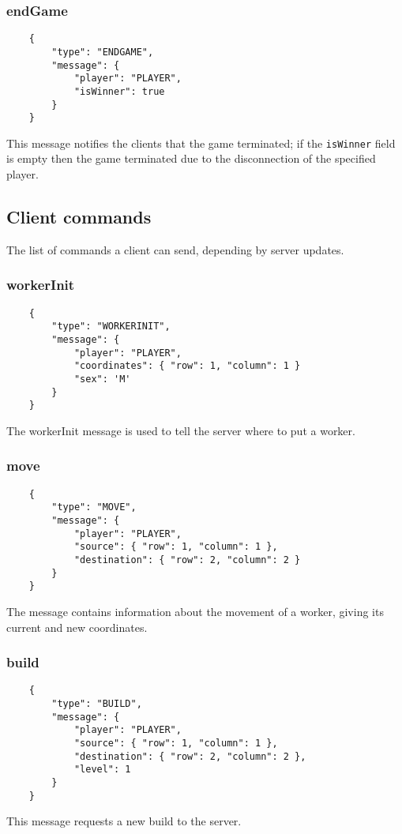 \documentclass[a4paper,12pt,english]{article}
\begin{document}
	\subsubsection{endGame}
	\begin{verbatim}
	{
	    "type": "ENDGAME",
	    "message": {
	        "player": "PLAYER", 
	        "isWinner": true
	    }
	}
	\end{verbatim}
	This message notifies the clients that the game terminated; if the \texttt{isWinner} field is empty then the game terminated due to the disconnection of the specified player.
	
	\subsection{Client commands}
	The list of commands a client can send, depending by server updates.
	
	\subsubsection{workerInit}
	\begin{verbatim}
	{
	    "type": "WORKERINIT",
	    "message": {
	        "player": "PLAYER",
	        "coordinates": { "row": 1, "column": 1 }
	        "sex": 'M'
	    }
	}
	\end{verbatim}
	The workerInit message is used to tell the server where to put a worker.
	
	\subsubsection{move}
	\begin{verbatim}
	{
	    "type": "MOVE",
	    "message": {
	        "player": "PLAYER",
	        "source": { "row": 1, "column": 1 },
	        "destination": { "row": 2, "column": 2 }
	    }
	}
	\end{verbatim}
	The message contains information about the movement of a worker, giving its current and new coordinates.
	
	\subsubsection{build}
	\begin{verbatim}
	{
	    "type": "BUILD",
	    "message": {
	        "player": "PLAYER",
	        "source": { "row": 1, "column": 1 },
	        "destination": { "row": 2, "column": 2 },
	        "level": 1
	    }
	}
	\end{verbatim}
	This message requests a new build to the server.
	
\end{document}
